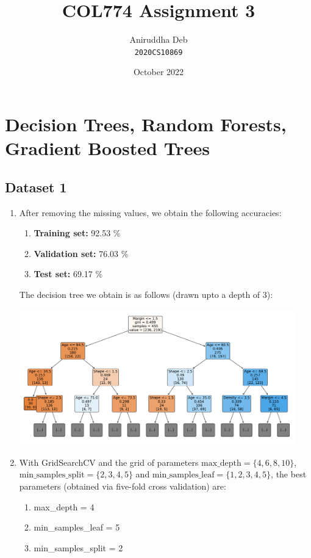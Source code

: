 \documentclass[12pt]{article}
\title{\textbf{COL774 Assignment 3}}
\author{Aniruddha Deb \\ \texttt{2020CS10869}}
\date{October 2022}
\begin{document}
\maketitle

\section{Decision Trees, Random Forests, Gradient Boosted Trees}

\subsection{Dataset 1}

\begin{enumerate}[label=(\alph*)]
    \item After removing the missing values, we obtain the following accuracies:
    \begin{enumerate}[label=(\roman*)]
        \item \textbf{Training set:} 92.53 \%
        \item \textbf{Validation set:} 76.03 \%
        \item \textbf{Test set:} 69.17 \%
    \end{enumerate}

    The decision tree we obtain is as follows (drawn upto a depth of 3):
    \begin{center}
        \includegraphics[width=0.94\textwidth]{../Q1/tree.pdf}
    \end{center}

    \item With GridSearchCV and the grid of parameters $\text{max\_depth}=\{4,6,8,10\}$, 
    $\text{min\_samples\_split}=\{2,3,4,5\}$ and $\text{min\_samples\_leaf}=\{1,2,3,4,5\}$,
    the best parameters (obtained via five-fold cross validation) are:
    \begin{enumerate}[label=(\roman*)]
        \item max\_depth = 4
        \item min\_samples\_leaf = 5
        \item min\_samples\_split = 2
    \end{enumerate}


\end{enumerate}
\end{document}
